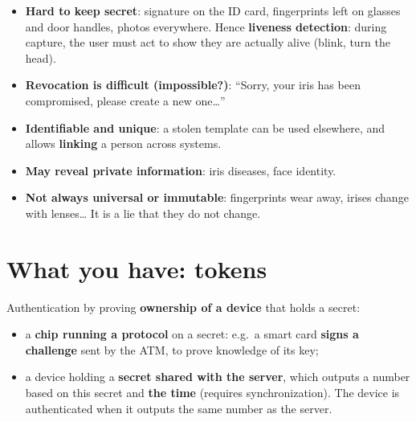\begin{warnbox}[title=Problems with biometrics]
\begin{itemize}
  \item \textbf{Hard to keep secret}: signature on the ID card, fingerprints left on glasses and
        door handles, photos everywhere. Hence \textbf{liveness detection}: during capture, the
        user must act to show they are actually alive (blink, turn the head).
  \item \textbf{Revocation is difficult (impossible?)}: ``Sorry, your iris has been compromised,
        please create a new one\ldots''
  \item \textbf{Identifiable and unique}: a stolen template can be used elsewhere, and allows
        \textbf{linking} a person across systems.
  \item \textbf{May reveal private information}: iris diseases, face identity.
  \item \textbf{Not always universal or immutable}: fingerprints wear away, irises change with
        lenses\ldots{} It is a lie that they do not change.
\end{itemize}
\end{warnbox}

\section{What you have: tokens}

\begin{defnbox}[title=Tokens]
Authentication by proving \textbf{ownership of a device} that holds a secret:
\begin{itemize}
  \item a \textbf{chip running a protocol} on a secret: e.g.\ a smart card \textbf{signs a
        challenge} sent by the ATM, to prove knowledge of its key;
  \item a device holding a \textbf{secret shared with the server}, which outputs a number based on
        this secret and \textbf{the time} (requires synchronization). The device is authenticated
        when it outputs the same number as the server.
\end{itemize}
\end{defnbox}


